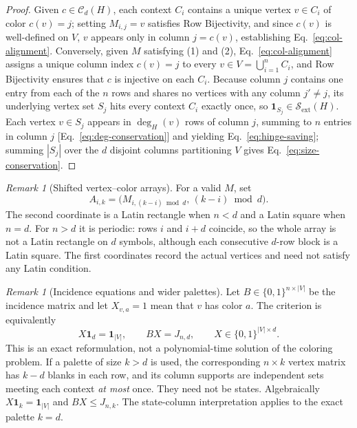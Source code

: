\documentclass[aps,pra,reprint,superscriptaddress,longbibliography,nofootinbib,floatfix,10pt]{revtex4-2}
\theoremstyle{definition}\newtheorem{definition}[theorem]{Definition}
\theoremstyle{remark}\newtheorem{remark}[theorem]{Remark}
\newcommand{\Sc}{\mathcal S}\newcommand{\Cc}{\mathcal C}
\begin{document}
\begin{proof}
Given $c\in\Cc_d(H)$, each context $C_i$ contains a unique vertex $v\in C_i$ of color $c(v)=j$; setting $M_{i,j}=v$ satisfies Row Bijectivity, and since $c(v)$ is well-defined on $V$, $v$ appears only in column $j=c(v)$, establishing Eq.~\eqref{eq:col-alignment}. Conversely, given $M$ satisfying (1) and (2), Eq.~\eqref{eq:col-alignment} assigns a unique column index $c(v)=j$ to every $v\in V=\bigcup_{i=1}^n C_i$, and Row Bijectivity ensures that $c$ is injective on each $C_i$. Because column $j$ contains one entry from each of the $n$ rows and shares no vertices with any column $j'\neq j$, its underlying vertex set $S_j$ hits every context $C_i$ exactly once, so $\mathbf{1}_{S_j}\in\Sc_{\mathrm{ext}}(H)$. Each vertex $v\in S_j$ appears in $\deg_H(v)$ rows of column $j$, summing to $n$ entries in column $j$ [Eq.~\eqref{eq:deg-conservation}] and yielding Eq.~\eqref{eq:hinge-saving}; summing $|S_j|$ over the $d$ disjoint columns partitioning $V$ gives Eq.~\eqref{eq:size-conservation}.
\end{proof}

\begin{remark}[Shifted vertex--color arrays]\label{rem:vertex-color-array}
For a valid $M$, set
\begin{equation}\label{eq:shifted-array}
A_{i,k}=\bigl(M_{i,(k-i)\bmod d},\,(k-i)\bmod d\bigr).
\end{equation}
The second coordinate is a Latin rectangle when $n<d$ and a Latin square when $n=d$. For $n>d$ it is periodic: rows $i$ and $i+d$ coincide, so the whole array is not a Latin rectangle on $d$ symbols, although each consecutive $d$-row block is a Latin square. The first coordinates record the actual vertices and need not satisfy any Latin condition.
\end{remark}

\begin{remark}[Incidence equations and wider palettes]\label{rem:wider-palette}
Let $B\in\{0,1\}^{n\times |V|}$ be the incidence matrix and let $X_{v,a}=1$ mean that $v$ has color $a$. The criterion is equivalently
\begin{equation}\label{eq:incidence-factorization}
X\mathbf1_d=\mathbf1_{|V|},\qquad BX=J_{n,d},\qquad X\in\{0,1\}^{|V|\times d}.
\end{equation}
This is an exact reformulation, not a polynomial-time solution of the coloring problem. If a palette of size $k>d$ is used, the corresponding $n\times k$ vertex matrix has $k-d$ blanks in each row, and its column supports are independent sets meeting each context \emph{at most} once. They need not be states. Algebraically $X\mathbf1_k=\mathbf1_{|V|}$ and $BX\le J_{n,k}$. The state-column interpretation applies to the exact palette $k=d$.
\end{remark}
\end{document}
